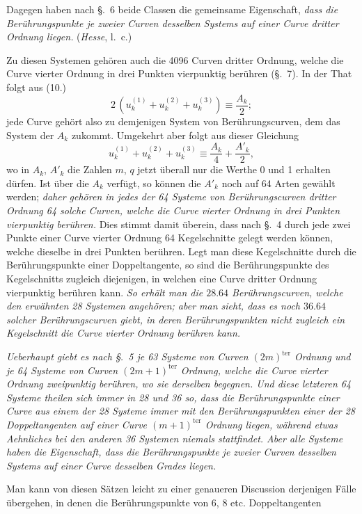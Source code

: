 \documentclass{article}
\begin{document}
Dagegen haben nach §.~6 beide Classen die gemeinsame Eigenschaft, \emph{dass die Berührungspunkte je zweier Curven desselben Systems auf einer Curve dritter Ordnung liegen.} (\emph{Hesse}, l.\ c.)

Zu diesen Systemen gehören auch die 4096 Curven dritter Ordnung, welche die Curve vierter Ordnung in drei Punkten vierpunktig berühren (§.~7). In der That folgt aus (10.)
\[
2\,(u_{k}^{(1)}+u_{k}^{(2)}+u_{k}^{(3)}) \equiv \frac{A_{k}}{2};
\]
jede Curve gehört also zu demjenigen System von Berührungscurven, dem das System der $A_{k}$ zukommt. Umgekehrt aber folgt aus dieser Gleichung
\[
u_{k}^{(1)}+u_{k}^{(2)}+u_{k}^{(3)} \equiv \frac{A_{k}}{4}+\frac{A'_{k}}{2},
\]
wo in $A_{k}$, $A'_{k}$ die Zahlen $m$, $q$ jetzt überall nur die Werthe 0 und 1 erhalten dürfen. Ist über die $A_{k}$ verfügt, so können die $A'_{k}$ noch auf 64 Arten gewählt werden; \emph{daher gehören in jedes der 64 Systeme von Berührungscurven dritter Ordnung 64 solche Curven, welche die Curve vierter Ordnung in drei Punkten vierpunktig berühren.} Dies stimmt damit überein, dass nach §.~4 durch jede zwei Punkte einer Curve vierter Ordnung 64 Kegelschnitte gelegt werden können, welche dieselbe in drei Punkten berühren. Legt man diese Kegelschnitte durch die Berührungspunkte einer Doppeltangente, so sind die Berührungspunkte des Kegelschnitts zugleich diejenigen, in welchen eine Curve dritter Ordnung vierpunktig berühren kann. \emph{So erhält man die $28.64$ Berührungscurven, welche den erwähnten 28 Systemen angehören; aber man sieht, dass es noch $36.64$ solcher Berührungscurven giebt, in deren Berührungspunkten nicht zugleich ein Kegelschnitt die Curve vierter Ordnung berühren kann.}

\emph{Ueberhaupt giebt es nach §.~5 je 63 Systeme von Curven $(2m)^{\text{ter}}$ Ordnung und je 64 Systeme von Curven $(2m+1)^{\text{ter}}$ Ordnung, welche die Curve vierter Ordnung zweipunktig berühren, wo sie derselben begegnen. Und diese letzteren 64 Systeme theilen sich immer in 28 und 36 so, dass die Berührungspunkte einer Curve aus einem der 28 Systeme immer mit den Berührungspunkten einer der 28 Doppeltangenten auf einer Curve $(m+1)^{\text{ter}}$ Ordnung liegen, während etwas Aehnliches bei den anderen 36 Systemen niemals stattfindet. Aber alle Systeme haben die Eigenschaft, dass die Berührungspunkte je zweier Curven desselben Systems auf einer Curve desselben Grades liegen.}

Man kann von diesen Sätzen leicht zu einer genaueren Discussion derjenigen Fälle übergehen, in denen die Berührungspunkte von 6, 8 etc. Doppeltangenten
\end{document}
